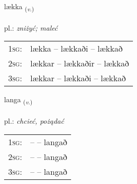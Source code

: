 \documentclass[frontgrid, backgrid]{flacards}\usepackage[]{graphicx}\usepackage[]{xcolor}
\begin{document}
\renewcommand{\blhead}{\vskip5pt {\small\bfseries\footnotesize Sagnorð | Verb }}
\renewcommand{\bcfoot}{\vskip5pt \hspace{2pt}{\small\bfseries\footnotesize 1K}}


{lækka \small{\textsubscript{(\textit{v.})}} \\[1ex] %
\textphonetic{[laihka]} \\
pl.: \emph{zniżyć; maleć} \\  [2ex]
\renewcommand*{\arraystretch}{0.8}
\begin{tabular}{p{1cm}l}
\textsc{1sg}: & lækka -- lækkaði -- lækkað \\ 
\textsc{2sg}: & lækkar -- lækkaðir -- lækkað \\ 
\textsc{3sg}: & lækkar -- lækkaði -- lækkað \\ 
\end{tabular}
}

\renewcommand{\flhead}{\vskip5pt \fboxsep=0pt {\small\bfseries\footnotesize Sagnorð | Verb}}
\renewcommand{\fcfoot}{\vskip5pt \fboxsep=0pt \hspace{2pt}{\small\bfseries\footnotesize 1K}}

\renewcommand{\blhead}{\vskip5pt {\small\bfseries\footnotesize Sagnorð | Verb }}
\renewcommand{\bcfoot}{\vskip5pt \hspace{2pt}{\small\bfseries\footnotesize 1K}}


{langa \small{\textsubscript{(\textit{v.})}} \\[1ex] %
\textphonetic{[lauŋka]} \\
pl.: \emph{chcieć, pożądać} \\  [2ex]
\renewcommand*{\arraystretch}{0.8}
\begin{tabular}{p{1cm}l}
\textsc{1sg}: &  --  -- langað \\ 
\textsc{2sg}: &  --  -- langað \\ 
\textsc{3sg}: &  --  -- langað \\ 
\end{tabular}
}

\renewcommand{\flhead}{\vskip5pt \fboxsep=0pt {\small\bfseries\footnotesize Lýsingarorð | Adjective}}
\renewcommand{\fcfoot}{\vskip5pt \fboxsep=0pt \hspace{2pt}{\small\bfseries\footnotesize 1K}}
\end{document}

